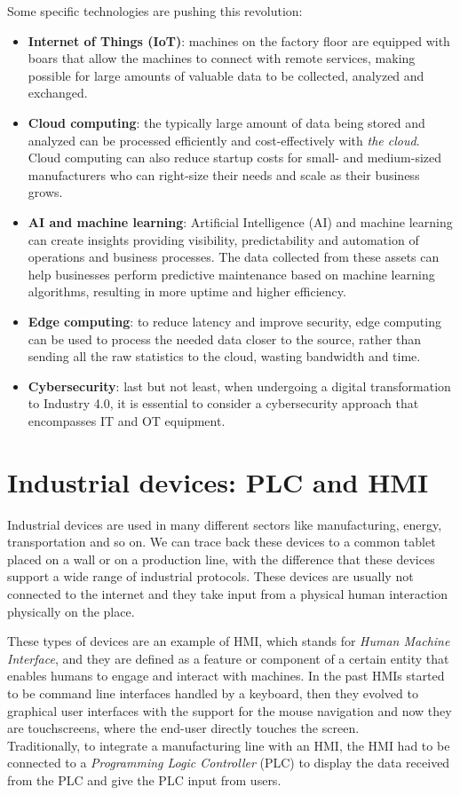Some specific technologies are pushing this revolution:~\cite{what-is-industry-4-0}
\begin{itemize}
  \item \textbf{Internet of Things (IoT)}: machines on the factory floor are equipped with boars that allow the machines to connect with remote services, making possible for large amounts of valuable data to be collected, analyzed and exchanged.
  \item \textbf{Cloud computing}: the typically large amount of data being stored and analyzed can be processed efficiently and cost-effectively with \textit{the cloud}. Cloud computing can also reduce startup costs for small- and medium-sized manufacturers who can right-size their needs and scale as their business grows.
  \item \textbf{AI and machine learning}: Artificial Intelligence (AI) and machine learning can create insights providing visibility, predictability and automation of operations and business processes. The data collected from these assets can help businesses perform predictive maintenance based on machine learning algorithms, resulting in more uptime and higher efficiency.
  \item \textbf{Edge computing}: to reduce latency and improve security, edge computing can be used to process the needed data closer to the source, rather than sending all the raw statistics to the cloud, wasting bandwidth and time.
  \item \textbf{Cybersecurity}: last but not least, when undergoing a digital transformation to Industry 4.0, it is essential to consider a cybersecurity approach that encompasses IT and OT equipment.
\end{itemize}

\section{Industrial devices: PLC and HMI}

Industrial devices are used in many different sectors like manufacturing, energy, transportation and so on. We can trace back these devices to a common tablet placed on a wall or on a production line, with the difference that these devices support a wide range of industrial protocols. These devices are usually not connected to the internet and they take input from a physical human interaction physically on the place.

These types of devices are an example of HMI, which stands for \textit{Human Machine Interface}, and they are defined as a feature or component of a certain entity that enables humans to engage and interact with machines. In the past HMIs started to be command line interfaces handled by a keyboard, then they evolved to graphical user interfaces with the support for the mouse navigation and now they are touchscreens, where the end-user directly touches the screen.\\
Traditionally, to integrate a manufacturing line with an HMI, the HMI had to be connected to a \textit{Programming Logic Controller} (PLC) to display the data received from the PLC and give the PLC input from users.~\cite{what-is-hmi}

